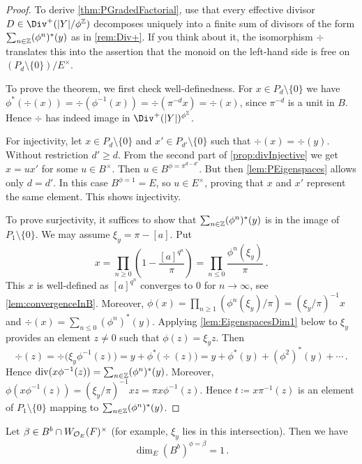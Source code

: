 \begin{proof}
	To derive \cref{thm:PGradedFactorial}, use that every effective divisor $D\in \Div^+(|Y|/\phi^\IZ)$ decomposes uniquely into a finite sum of divisors of the form $\sum_{n\in\IZ}(\phi^n)^*(y)$ as in \cref{rem:Div+}. If you think about it, the isomorphism $\div$ translates this into the assertion that the monoid on the left-hand side is free on $(P_d\setminus\{0\})/E^\times$.
	
	To prove the theorem, we first check well-definedness. For $x\in P_d\setminus\{0\}$ we have $\phi^*(\div(x))=\div(\phi^{-1}(x))=\div(\pi^{-d}x)=\div(x)$, since $\pi^{-d}$ is a unit in $B$. Hence $\div$ has indeed image in $\Div^+(|Y|)^{\phi^\IZ}$.
	
	For injectivity, let $x\in P_d\setminus\{0\}$ and $x'\in P_{d'}\setminus\{0\}$ such that $\div(x)=\div(y)$. Without restriction $d'\geq d$. From the second part of \cref{prop:divInjective} we get $x=ux'$ for some $u\in B^\times$. Then $u\in B^{\phi=\pi^{d-d'}}$. But then \cref{lem:PEigenspaces} allows only $d=d'$. In this case $B^{\phi=1}=E$, so $u\in E^\times$, proving that $x$ and $x'$  represent the same element. This shows injectivity.

	To prove surjectivity, it suffices to show that $\sum_{n\in\IZ}(\phi^n)^*(y)$ is in the image of $P_1\setminus\{0\}$. We may assume $\xi_y=\pi-[a]$. Put
	\begin{equation*}
		x=\prod_{n\geq 0}\left(1-\frac{[a]^{q^n}}{\pi}\right)=\prod_{n\leq 0}\frac{\phi^n(\xi_y)}\pi\,.
	\end{equation*}
	This $x$ is well-defined as $[a]^{q^n}$ converges to $0$ for $n\to\infty$, see \cref{lem:convergenceInB}. Moreover, $\phi(x)=\prod_{n\geq 1}(\phi^n(\xi_y)/\pi)=(\xi_y/\pi)^{-1}x$ and $\div(x)=\sum_{n\leq 0}(\phi^n)^*(y)$. Applying \cref{lem:EigenspacesDim1} below to $\xi_y$ provides an element $z\neq 0$ such that $\phi(z)=\xi_yz$. Then
	\begin{equation*}
		\div(z)=\div\big(\xi_y\phi^{-1}(z)\big)=y+\phi^*\big(\div(z)\big)=y+\phi^*(y)+(\phi^2)^*(y)+\dotsb\,.
	\end{equation*}
	Hence $\div(x\phi^{-1}(z))=\sum_{n\in\IZ}(\phi^n)^*(y)$. Moreover, $\phi(x\phi^{-1}(z))=(\xi_y/\pi)^{-1}xz=\pi x\phi^{-1}(z)$. Hence $t\coloneqq x\pi^{-1}(z)$ is an element of $P_1\setminus\{0\}$ mapping to $\sum_{n\in\IZ}(\phi^n)^*(y)$.
\end{proof}
\begin{lem}\label{lem:EigenspacesDim1}
	Let $\beta\in B^b\cap W_{\mathcal{O}_E}(F)^\times$ (for example, $\xi_y$ lies in this intersection). Then we have
	\begin{equation*}
		\dim_E(B^b)^{\phi=\beta}=1\,.
	\end{equation*}
\end{lem}
